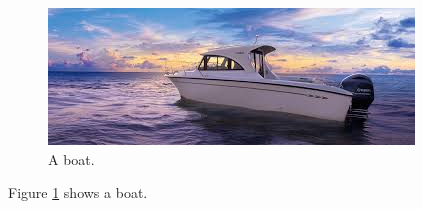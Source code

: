 \documentclass{article}
\begin{document}
\begin{figure}
   \includegraphics[width=\linewidth]{boat.jpeg}
   \caption{A boat.}
   \label{fig:boat1} %
\end{figure}

Figure \ref{fig:boat1} shows a boat. %
\end{document}
